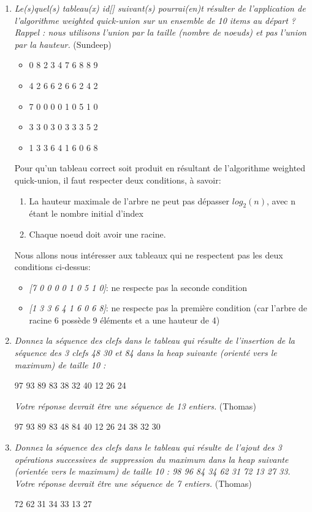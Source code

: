 \documentclass[11pt]{article}
\begin{document}
\begin{enumerate}
\item \textit{Le(s)quel(s) tableau(x) id[] suivant(s) pourrai(en)t résulter de l'application de l'algorithme weighted quick-union sur un ensemble de 10 items au départ ? Rappel : nous utilisons l'union par la taille (nombre de noeuds) et pas l'union par la hauteur.} (Sundeep)
\begin{itemize}
\item 0 8 2 3 4 7 6 8 8 9
\item 4 2 6 6 2 6 6 2 4 2
\item 7 0 0 0 0 1 0 5 1 0
\item 3 3 0 3 0 3 3 3 5 2
\item 1 3 3 6 4 1 6 0 6 8
\end{itemize}
\bigskip
Pour qu'un tableau correct soit produit en résultant de l'algorithme weighted quick-union, il faut respecter deux conditions, à savoir:
\begin{enumerate}
\item La hauteur maximale de l'arbre ne peut pas dépasser $log_2(n)$, avec n étant le nombre initial d'index
\item Chaque noeud doit avoir une racine. 
\end{enumerate}
Nous allons nous intéresser aux tableaux qui ne respectent pas les deux conditions ci-dessus:
\begin{itemize}
\item \textit{[7 0 0 0 0 1 0 5 1 0]}: ne respecte pas la seconde condition
\item \textit{[1 3 3 6 4 1 6 0 6 8]}: ne respecte pas la première condition (car l'arbre de racine 6 possède 9 éléments et a une hauteur de 4)
\end{itemize}
\bigskip



\item \textit{Donnez la séquence des clefs dans le tableau qui résulte de l'insertion de la séquence des 3 clefs 48 30 et 84 dans la heap suivante (orienté vers le maximum) de taille 10 :}\\ 
\centerline{97 93 89 83 38 32 40 12 26 24}
\textit{Votre réponse devrait être une séquence de 13 entiers.} (Thomas)\\
\centerline{97  93  89  83  48  84  40  12  26  24  38  32  30}
\bigskip


\item \textit{Donnez la séquence des clefs dans le tableau qui résulte de l'ajout des 3 opérations successives de suppression du maximum dans la heap suivante (orientée vers le maximum) de taille 10 : 98 96 84 34 62 31 72 13 27 33. Votre réponse devrait être une séquence de 7 entiers.} (Thomas)\\
\centerline{72  62  31  34  33  13  27}
\bigskip



\end{enumerate}
\end{document}
